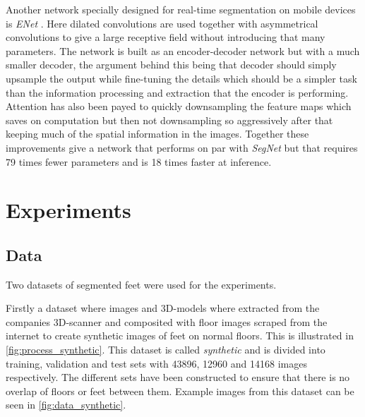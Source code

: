 \documentclass{kththesis}
\newcommand{\bibentry}[1]{\parencite{#1}}
\begin{document}
Another network specially designed for real-time segmentation on mobile devices is \emph{ENet} \bibentry{paszke2016enet}. Here dilated convolutions are used together with asymmetrical convolutions to give a large receptive field without introducing that many parameters. The network is built as an encoder-decoder network but with a much smaller decoder, the argument behind this being that decoder should simply upsample the output while fine-tuning the details which should be a simpler task than the information processing and extraction that the encoder is performing. Attention has also been payed to quickly downsampling the feature maps which saves on computation but then not downsampling so aggressively after that keeping much of the spatial information in the images. Together these improvements give a network that performs on par with \emph{SegNet} but that requires 79 times fewer parameters and is 18 times faster at inference.


\chapter{Experiments}
\section{Data}
Two datasets of segmented feet were used for the experiments.

Firstly a dataset where images and 3D-models where extracted from the companies
3D-scanner and composited with floor images scraped from the internet to create
synthetic images of feet on normal floors. This is illustrated in \cref{fig:process_synthetic}.
This dataset is called
\textit{synthetic} and is divided into training, validation and test sets with
43896, 12960 and 14168 images respectively. The different sets have been
constructed to ensure that there is no overlap of floors or feet between them.
Example images from this dataset can be seen in \cref{fig:data_synthetic}.
\end{document}
